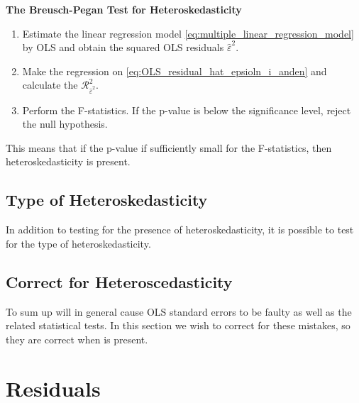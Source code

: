 \textbf{The Breusch-Pegan Test for Heteroskedasticity}
\begin{enumerate}[label=(\roman*)]
    \item Estimate the linear regression model \eqref{eq:multiple_linear_regression_model} by OLS and obtain the squared OLS residuals $\hat{\varepsilon}^2$. 
    \item Make the regression on \eqref{eq:OLS_residual_hat_epsioln_i_anden} and calculate the $\mathcal{R}^2_{\hat{\varepsilon}^2}$. 
    \item Perform the F-statistics. If the p-value is below the significance level, reject the null hypothesis. 
\end{enumerate}

This means that if the p-value if sufficiently small for the F-statistics, then heteroskedasticity is present. 

\begin{example}

\end{example}

\subsection{Type of Heteroskedasticity}
In addition to testing for the presence of heteroskedasticity, it is possible to test for the type of heteroskedasticity. 



\subsection{Correct for Heteroscedasticity}
To sum up \hetero will in general cause OLS standard errors to be faulty as well as the related statistical tests. In this section we wish to correct for these mistakes, so they are correct when \hetero is present.




















\section{Residuals}\label{subsec:residuals}

